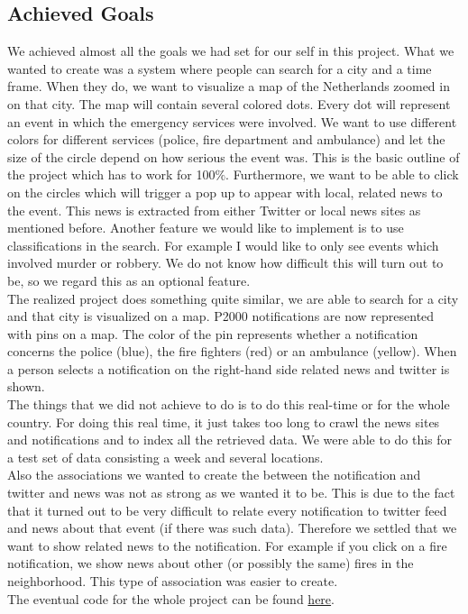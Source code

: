 \subsection*{Achieved Goals}
We achieved almost all the goals we had set for our self in this project. 
What we wanted to create was a system where people can search for a city and a time frame.
When they do, we want to visualize a map of the Netherlands zoomed in on that city. 
The map will contain several colored dots. 
Every dot will represent an event in which the emergency services were involved. 
We want to use different colors for different services (police, fire department and ambulance) and let the size of the circle depend on how serious the event was. This is the basic outline of the project which has to work for 100$\%$. Furthermore, we want to be able to click on the circles which will trigger a pop up to appear with local, related news to the event. This news is extracted from either Twitter or local news sites as mentioned before. Another feature we would like to implement is to use classifications in the search. For example I would like to only see events which involved murder or robbery. We do not know how difficult this will turn out to be, so we regard this as an optional feature.\\
The realized project does something quite similar, we are able to search for a city and that city is visualized on a map.
P2000 notifications are now represented with pins on a map. 
The color of the pin represents whether a notification concerns the police (blue), the fire fighters (red) or an ambulance (yellow).
When a person selects a notification on the right-hand side related news and twitter is shown.\\
The things that we did not achieve to do is to do this real-time or for the whole country. 
For doing this real time, it just takes too long to crawl the news sites and notifications and to index all the retrieved data.
We were able to do this for a test set of data consisting a week and several locations.\\
Also the associations we wanted to create the between the notification and twitter and news was not as strong as we wanted it to be.
This is due to the fact that it turned out to be very difficult to relate every notification to twitter feed and news about that event (if there was such data).
Therefore we settled that we want to show related news to the notification.
For example if you click on a fire notification, we show news about other (or possibly the same) fires in the neighborhood.
This type of association was easier to create.\\
The eventual code for the whole project can be found \href{https://www.dropbox.com/home/Public/Code_2IMW15_Group_20}{here}.

